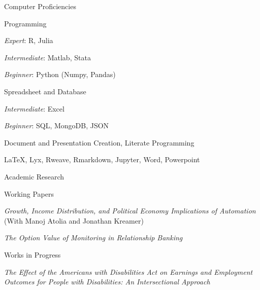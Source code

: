 \documentclass{resume} %
\begin{document}
\begin{rSection}{Computer Proficiencies}

\begin{rSubsection}{Programming}{}{}{}
    \item {\em Expert}: R, Julia
    \item {\em Intermediate}: Matlab, Stata 
    \item {\em Beginner}: Python (Numpy, Pandas)
\end{rSubsection}

\begin{rSubsection}{Spreadsheet and Database}{}{}{}
    \item {\em Intermediate}: Excel 
    \item {\em Beginner}: SQL, MongoDB, JSON
\end{rSubsection}

\begin{rSubsection}{Document and Presentation Creation, Literate Programming}{}{}{}
    \item \LaTeX, Lyx, Rweave, Rmarkdown, Jupyter, Word, Powerpoint
\end{rSubsection}

\end{rSection}



\begin{rSection}{Academic Research}

\begin{rSubsection}{Working Papers}{}{}{}
\item {\em Growth, Income Distribution, and Political Economy Implications of Automation} (With Manoj Atolia and Jonathan Kreamer)
\item {\em The Option Value of Monitoring in Relationship Banking}
\end{rSubsection}

\begin{rSubsection}{Works in Progress}{}{}{}
\item {\em The Effect of the Americans with Disabilities Act on Earnings and Employment Outcomes for People with Disabilities: An Intersectional Approach}
\end{rSubsection}

\end{rSection}





\end{document}
